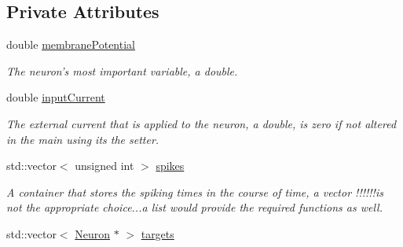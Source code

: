 \subsection*{Private Attributes}
\begin{DoxyCompactItemize}
\item 
\hypertarget{classNeuron_a311f3321f19462c0aef8cbd68c60df67}{double \hyperlink{classNeuron_a311f3321f19462c0aef8cbd68c60df67}{membrane\-Potential}}\label{classNeuron_a311f3321f19462c0aef8cbd68c60df67}

\begin{DoxyCompactList}\small\item\em The neuron's most important variable, a double. \end{DoxyCompactList}\item 
\hypertarget{classNeuron_a50505e8dcb655170bfc9562465fd907f}{double \hyperlink{classNeuron_a50505e8dcb655170bfc9562465fd907f}{input\-Current}}\label{classNeuron_a50505e8dcb655170bfc9562465fd907f}

\begin{DoxyCompactList}\small\item\em The external current that is applied to the neuron, a double, is zero if not altered in the main using its the setter. \end{DoxyCompactList}\item 
\hypertarget{classNeuron_ab358994e1a6e4d3a1399906471657b4b}{std\-::vector$<$ unsigned int $>$ \hyperlink{classNeuron_ab358994e1a6e4d3a1399906471657b4b}{spikes}}\label{classNeuron_ab358994e1a6e4d3a1399906471657b4b}

\begin{DoxyCompactList}\small\item\em A container that stores the spiking times in the course of time, a vector !!!!!!is not the appropriate choice...a list would provide the required functions as well. \end{DoxyCompactList}\item 
\hypertarget{classNeuron_a5c97843cd38dd8c5ff2d861d25e18473}{std\-::vector$<$ \hyperlink{classNeuron}{Neuron} $\ast$ $>$ \hyperlink{classNeuron_a5c97843cd38dd8c5ff2d861d25e18473}{targets}}\label{classNeuron_a5c97843cd38dd8c5ff2d861d25e18473}


\end{DoxyCompactItemize}
